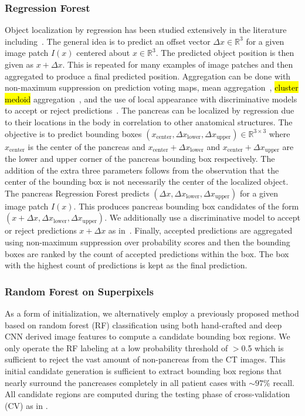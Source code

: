 \documentclass[journal]{IEEEtran}
\begin{document}
\subsubsection{Regression Forest}\label{sec:regression}
Object localization by regression has been studied extensively in the literature including~\cite{criminisi2013regression,regressionKidneys,laybirkbeck2013}. The general idea is to predict an offset vector $\Delta x \in \mathbb{R}^3$ for a given image patch $I(x)$ centered about $x \in \mathbb{R}^3$. The predicted object position is then given as $x + \Delta x$. This is repeated for many examples of image patches and then aggregated to produce a final predicted position. Aggregation can be done with non-maximum suppression on prediction voting maps, mean aggregation~\cite{criminisi2013regression}, \hl{cluster medoid} aggregation~\cite{regressionKidneys}, and the use of local appearance with discriminative models to accept or reject predictions~\cite{laybirkbeck2013}.
The pancreas can be localized by regression due to their locations in the body in correlation to other anatomical structures. The objective is to predict bounding boxes $(x_{\text{center}},\Delta x_{\text{lower}}, \Delta x_{\text{upper}}) \in \mathbb{R}^{3 \times 3}$ where $x_{\text{center}}$ is the center of the pancreas and $x_{\text{center}} + \Delta x_{\text{lower}}$ and $x_{\text{center}} + \Delta x_{\text{upper}}$ are the lower and upper corner of the pancreas bounding box respectively. The addition of the extra three parameters follows from the observation that the center of the bounding box is not necessarily the center of the localized object. The pancreas Regression Forest predicts $(\Delta x, \Delta x_{\text{lower}}, \Delta x_{\text{upper}})$ for a given image patch $I(x)$. This produces pancreas bounding box candidates of the form $(x + \Delta x, \Delta x_{\text{lower}}, \Delta x_{\text{upper}})$. We additionally use a discriminative model to accept or reject predictions $x + \Delta x$ as in~\cite{laybirkbeck2013}. Finally, accepted predictions are aggregated using non-maximum suppression over probability scores and then the bounding boxes are ranked by the count of accepted predictions within the box. The box with the highest count of predictions is kept as the final prediction. \subsubsection{Random Forest on Superpixels}
\label{sec:region_candidates_RF}
As a form of initialization, we alternatively employ a previously proposed method based on random forest (RF) classification \cite{farag2014bottom,roth2015deeporgan} using both hand-crafted and deep CNN derived image features to compute a candidate bounding box regions. We only operate the RF labeling at a low probability threshold of $>$0.5 which is sufficient to reject the vast amount of non-pancreas from the CT images. This initial candidate generation is sufficient to extract bounding box regions that nearly surround the pancreases completely in all patient cases with $\sim97$\% recall. All candidate regions are computed during the testing phase of cross-validation (CV) as in \cite{roth2015deeporgan}.   
\end{document}
